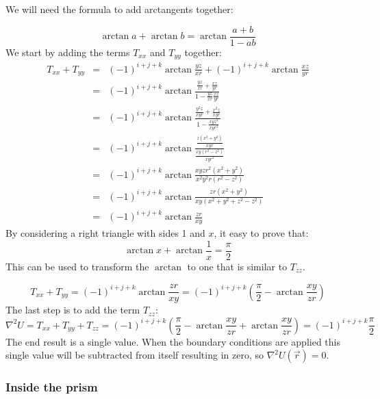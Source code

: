 We will need the formula to add arctangents together:

\begin{equation}
\arctan{a} + \arctan{b} = \arctan{\frac{a+b}{1-ab}}
\end{equation}
We start by adding the terms $T_{xx}$ and $T_{yy}$ together:
\begin{eqnarray}
T_{xx} + T_{yy} 
&=& (-1)^{i+j+k} \arctan{\frac{y z}{x r}} + (-1)^{i+j+k} \arctan{\frac{x z}{y r}} \nonumber\\
&=& (-1)^{i+j+k} \arctan{\frac{\frac{yz}{xr}+\frac{xz}{yr}}{1-\frac{yz}{xr}\frac{xz}{yr}}} \nonumber\\
&=& (-1)^{i+j+k} \arctan{\frac{\frac{y^2z}{xyr}+\frac{x^2z}{xyr}}{1-\frac{xyz^2}{xyr^2}}} \nonumber\\
&=& (-1)^{i+j+k} \arctan{\frac{\frac{z(x^2+y^2)}{xyr}}{\frac{xy(r^2-z^2)}{xyr^2}}} \nonumber\\
&=& (-1)^{i+j+k} \arctan{\frac{xyzr^2(x^2+y^2)}{x^2y^2r(r^2-z^2)}} \nonumber\\
&=& (-1)^{i+j+k} \arctan{\frac{zr(x^2+y^2)}{xy(x^2+y^2+z^2-z^2)}} \nonumber\\
&=& (-1)^{i+j+k} \arctan{\frac{zr}{xy}}
\end{eqnarray}
By considering a right triangle with sides 1 and $x$, it easy to prove that:
\begin{equation}
\arctan{x} + \arctan{\frac{1}{x}} = \frac\pi2
\end{equation}
This can be used to transform the $\arctan$ to one that is similar to $T_{zz}$.

\begin{equation}
T_{xx} + T_{yy} 
= (-1)^{i+j+k} \arctan{\frac{zr}{xy}} 
= (-1)^{i+j+k} \left( \frac{\pi}{2} - \arctan{\frac{xy}{zr}} \right)
\end{equation}
The last step is to add the term $T_{zz}$:
\begin{equation}
\nabla^2 U 
= T_{xx} + T_{yy} + T_{zz} 
= (-1)^{i+j+k} \left( \frac{\pi}{2} - \arctan{\frac{xy}{zr}} + \arctan{\frac{xy}{zr}}\right) 
= (-1)^{i+j+k} \frac{\pi}{2}
\end{equation}
The end result is a single value. 
When the boundary conditions are applied this single value will be 
subtracted from itself resulting in zero, so $\nabla^2 U(\vec{r})=0$.

\subsubsection{Inside the prism}

